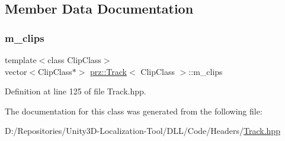 \subsection{Member Data Documentation}
\mbox{\label{classprz_1_1_track_a9f10f83e79d7271343b4b0d5c3db8bff}} 
\subsubsection{\texorpdfstring{m\_clips}{m\_clips}}
{\footnotesize\ttfamily template$<$class Clip\+Class$>$ \\
vector$<$Clip\+Class$\ast$$>$ \mbox{\hyperlink{classprz_1_1_track}{prz\+::\+Track}}$<$ Clip\+Class $>$\+::m\+\_\+clips\hspace{0.3cm}{\ttfamily [protected]}}



Definition at line 125 of file Track.\+hpp.



The documentation for this class was generated from the following file\+:\begin{DoxyCompactItemize}
\item 
D\+:/\+Repositories/\+Unity3\+D-\/\+Localization-\/\+Tool/\+D\+L\+L/\+Code/\+Headers/\mbox{\hyperlink{_track_8hpp}{Track.\+hpp}}\end{DoxyCompactItemize}

